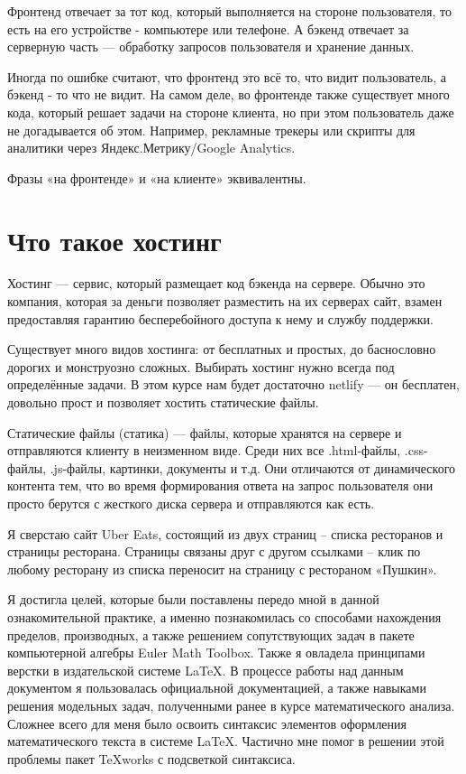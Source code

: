 \documentclass[14pt]{extreport}
\begin{document}
Фронтенд отвечает за тот код, который выполняется на стороне пользователя, то есть на его устройстве - компьютере или телефоне. А бэкенд отвечает за серверную часть — обработку запросов пользователя и хранение данных.

Иногда по ошибке считают, что фронтенд это всё то, что видит пользователь, а бэкенд - то что не видит. На самом деле, во фронтенде также существует много кода, который решает задачи на стороне клиента, но при этом пользователь даже не догадывается об этом. Например, рекламные трекеры или скрипты для аналитики через Яндекс.Метрику/Google Analytics.

Фразы «на фронтенде» и «на клиенте» эквивалентны.




\section{Что такое хостинг}

Хостинг — сервис, который размещает код бэкенда на сервере. Обычно это компания, которая за деньги позволяет разместить на их серверах сайт, взамен предоставляя гарантию бесперебойного доступа к нему и службу поддержки.

Существует много видов хостинга: от бесплатных и простых, до баснословно дорогих и монструозно сложных. Выбирать хостинг нужно всегда под определённые задачи. В этом курсе нам будет достаточно netlify — он бесплатен, довольно прост и позволяет хостить статические файлы.

Статические файлы (статика) — файлы, которые хранятся на сервере и отправляются клиенту в неизменном виде. Среди них все .html-файлы, .css-файлы, .js-файлы, картинки, документы и т.д. Они отличаются от динамического контента тем, что во время формирования ответа на запрос пользователя они просто берутся с жесткого диска сервера и отправляются как есть.





Я сверстаю сайт Uber Eats, состоящий из двух страниц – списка ресторанов и страницы ресторана. Страницы связаны друг с другом ссылками – клик по любому ресторану из списка переносит на страницу с рестораном «Пушкин».



\conclusions

Я достигла целей, которые были поставлены передо мной в данной ознакомительной практике, а именно познакомилась со способами нахождения пределов, производных, а также решением сопутствующих задач в пакете компьютерной алгебры Euler Math Toolbox. Также я овладела принципами верстки в издательской системе LaTeX.  В процессе работы над данным документом я пользовалась официальной документацией, а также навыками решения модельных задач, полученными ранее в курсе математического  анализа. Сложнее всего для меня было освоить синтаксис элементов оформления математического текста в системе LaTeX. Частично мне помог в решении этой проблемы пакет TeXworks с подсветкой синтаксиса.  
\end{document}
